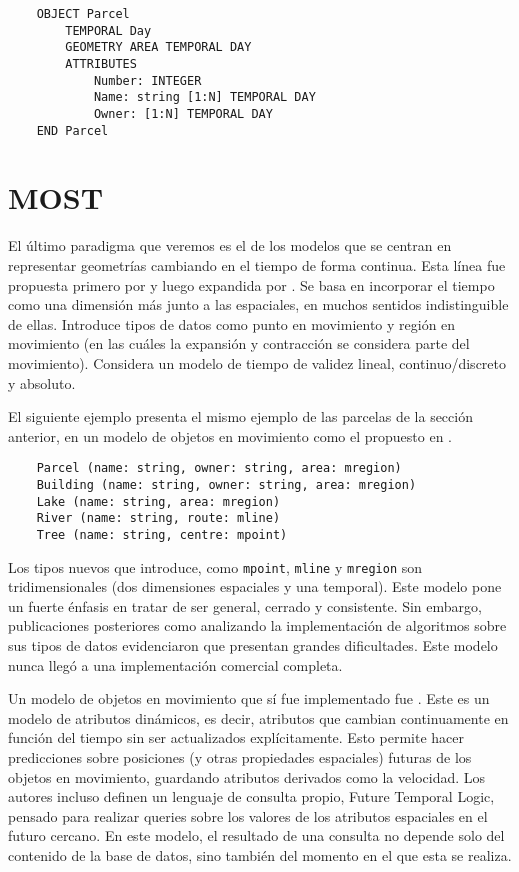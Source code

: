 \begin{verbatim}
    OBJECT Parcel
        TEMPORAL Day
        GEOMETRY AREA TEMPORAL DAY
        ATTRIBUTES
            Number: INTEGER
            Name: string [1:N] TEMPORAL DAY
            Owner: [1:N] TEMPORAL DAY
    END Parcel
\end{verbatim}


\section{MOST}

El último paradigma que veremos es el de los modelos que se centran en representar geometrías cambiando en el tiempo de forma continua. Esta línea fue propuesta primero por \cite{sp:moving} y luego expandida por \cite{sp:moving2}. Se basa en incorporar el tiempo como una dimensión más junto a las espaciales, en muchos sentidos indistinguible de ellas.
Introduce tipos de datos como punto en movimiento y región en movimiento (en las cuáles la expansión y contracción se considera parte del movimiento). Considera un modelo de tiempo de validez lineal, continuo/discreto y absoluto.

El siguiente ejemplo presenta el mismo ejemplo de las parcelas de la sección anterior, en un modelo de objetos en movimiento como el propuesto en \cite{sp:moving2}.

\begin{verbatim}
    Parcel (name: string, owner: string, area: mregion)
    Building (name: string, owner: string, area: mregion)
    Lake (name: string, area: mregion)
    River (name: string, route: mline)
    Tree (name: string, centre: mpoint)
\end{verbatim}

Los tipos nuevos que introduce, como \texttt{mpoint}, \texttt{mline} y \texttt{mregion} son tridimensionales (dos dimensiones espaciales y una temporal). Este modelo pone un fuerte énfasis en tratar de ser general, cerrado y consistente. Sin embargo, publicaciones posteriores como \cite{sp:moving3} analizando la implementación de algoritmos sobre sus tipos de datos evidenciaron que presentan grandes dificultades. Este modelo nunca llegó a una implementación comercial completa.

Un modelo de objetos en movimiento que sí fue implementado fue \textsuperscript{\cite{sp:most}}. Este es un modelo de atributos dinámicos, es decir, atributos que cambian continuamente en función del tiempo sin ser actualizados explícitamente. Esto permite hacer predicciones sobre posiciones (y otras propiedades espaciales) futuras de los objetos en movimiento, guardando atributos derivados como la velocidad. Los autores incluso definen un lenguaje de consulta propio, Future Temporal Logic, pensado para realizar queries sobre los valores de los atributos espaciales en el futuro cercano.
En este modelo, el resultado de una consulta no depende solo del contenido de la base de datos, sino también del momento en el que esta se realiza.

